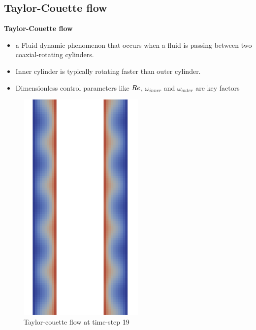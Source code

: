 \documentclass[aspectratio=169]{beamer}
\begin{document}
\subsection{Taylor-Couette flow}
\begin{frame}
  \begin{minipage}{0.45\textwidth}
    \large \color{TUCgreen}\textbf{Taylor-Couette flow}
    \begin{itemize}
      \item a Fluid dynamic phenomenon that occurs when a fluid is passing between two coaxial-rotating cylinders.
      \item Inner cylinder is typically rotating faster than outer cylinder.
      \item Dimensionless control parameters like \(\mathnormal{Re}\), $\omega_{inner}$ and $\omega_{outer}$  are key factors
    \end{itemize}
  \end{minipage}
  \begin{minipage}{0.45\textwidth}
    \vspace{-0.5 cm}
    \centering
    \begin{figure}[h]
      \includegraphics[width=0.55\textwidth]{Taylor_white_back.png}
      \caption{\tiny{Taylor-couette flow at time-step 19}}
    \end{figure}
  \end{minipage}
\end{frame}
\end{document}

